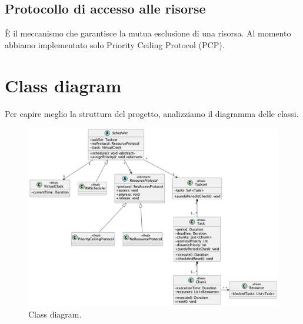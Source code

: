 \subsection{Protocollo di accesso alle risorse}
È il meccanismo che garantisce la mutua esclusione di una risorsa. Al momento abbiamo implementato solo Priority Ceiling Protocol (PCP).

\section{Class diagram}
Per capire meglio la struttura del progetto, analizziamo il diagramma delle classi.
\begin{figure}[htbp]
    \centering
    \includegraphics[width=.9\textwidth]{immagini/class diagram.pdf}
    \caption{Class diagram.}
\end{figure}